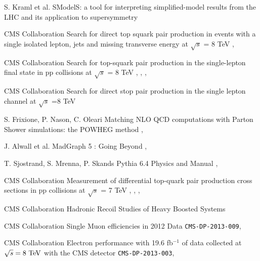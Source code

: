 {S. Kraml et al.}
{SModelS: a tool for interpreting simplified-model results from the LHC and its application to supersymmetry}
{ }


{CMS Collaboration}
{Search for direct top squark pair production in events with a single isolated lepton, jets and missing transverse energy at $\sqrt{s}$ = 8 TeV}
{, }

{CMS Collaboration}
{Search for top-squark pair production in the single-lepton final state in pp collisions at $\sqrt{s}$ = 8 TeV}
{, , , }

{CMS Collaboration}
{Search for direct stop pair production in the single lepton channel at $\sqrt{s}$ =8 TeV}
{}


{S. Frixione, P. Nason, C. Oleari}
{Matching NLO QCD computations with Parton Shower simulations: the POWHEG method}
{, }

{J. Alwall et al.}
{MadGraph 5 : Going Beyond}
{, }

{T. Sjostrand, S. Mrenna, P. Skands}
{Pythia 6.4 Physics and Manual}
{, }

{CMS Collaboration}
{Measurement of differential top-quark pair production
cross sections in pp collisions at $\sqrt{s}$ = 7 TeV}
{, , , }

{CMS Collaboration}
{Hadronic Recoil Studies of Heavy Boosted Systems}
{}


{CMS Collaboration}
{Single Muon efficiencies in 2012 Data}
{\texttt{CMS-DP-2013-009}, }

{CMS Collaboration}
{Electron performance with 19.6 fb$^{-1}$ of data collected at $\sqrt{s}=8~\text{TeV}$ with the CMS detector}
{\texttt{CMS-DP-2013-003}, }

